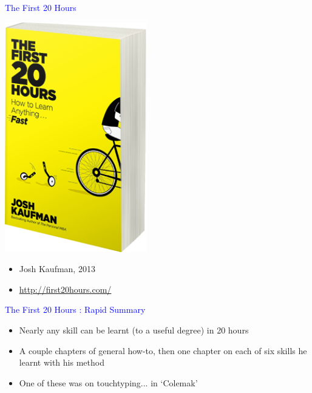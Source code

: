 \documentclass[landscape]{slides}
\begin{document}
\begin{slide}

    \textcolor{blue}{\Large{The First 20 Hours}}

    \includegraphics[height=10cm]{first20hours-cover}

    \begin{itemize}
        \item Josh Kaufman, 2013
        \item \url{http://first20hours.com/}
    \end{itemize}

\end{slide}


\begin{slide}

    \textcolor{blue}{\Large{The First 20 Hours : Rapid Summary}}

    \begin{itemize}
        \item Nearly any skill can be learnt (to a useful degree) in 20 hours
        \item A couple chapters of general how-to, then one chapter on each of six skills he learnt with his method
        \item One of these was on touchtyping... in `Colemak'
    \end{itemize}

\end{slide}
\end{document}
